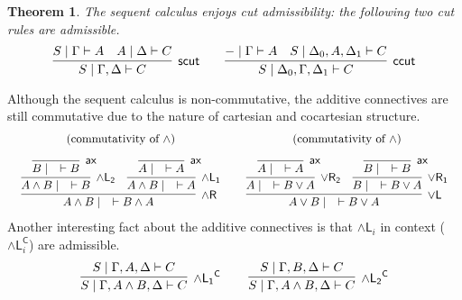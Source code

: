 \documentclass[submission,copyright,creativecommons]{eptcs}
\newtheorem{theorem}{Theorem}[section]
\theoremstyle{definition}
\newcommand{\andlone}{\land \mathsf{L_{1}}}
\newcommand{\andltwo}{\land \mathsf{L_{2}}}
\newcommand{\andli}{\land \mathsf{L}_{i}}
\newcommand{\andr}{\land \mathsf{R}}
\newcommand{\orl}{\lor \mathsf{L}}
\newcommand{\orrone}{\lor \mathsf{R_{1}}}
\newcommand{\orrtwo}{\lor \mathsf{R_{2}}}
\newcommand{\ax}{\mathsf{ax}}
\newcommand{\proofbox}[1]{\begin{tabular}{l} #1 \end{tabular}}
\begin{document}
\begin{theorem}
  The sequent calculus enjoys cut admissibility: the following two cut rules are admissible.
    \begin{displaymath}
      \infer[\mathsf{scut}]{S \mid \Gamma , \Delta \vdash C}{
        S \mid \Gamma \vdash A
        &
        A \mid \Delta \vdash C
      }
      \qquad
      \infer[\mathsf{ccut}]{S \mid \Delta_0 , \Gamma , \Delta_1 \vdash C}{
        {-} \mid \Gamma \vdash A
        &
        S \mid \Delta_0 , A , \Delta_1 \vdash C
      }
    \end{displaymath}
  \end{theorem}
  Although the sequent calculus is non-commutative, the additive connectives are still commutative due to the nature of cartesian and cocartesian structure.
  \begin{displaymath}
    \begin{array}{cc}
      (\text{commutativity of } \land) & (\text{commutativity of } \land)
      \\[10pt]
      \proofbox{
        \infer[\andr]{A \land B \mid \quad \vdash B \land A}{
          \infer[\andltwo]{A \land B \mid \quad \vdash B}{
            \infer[\ax]{B \mid \quad \vdash B}{}
          }
          &
          \infer[\andlone]{A \land B \mid \quad \vdash A}{
            \infer[\ax]{A \mid \quad \vdash A}{}
          }
        }
      }
      &
      \proofbox{
        \infer[\orl]{A \lor B \mid \quad \vdash B \lor A}{
          \infer[\orrtwo]{A \mid \quad \vdash B \lor A}{
            \infer[\ax]{A \mid \quad \vdash A}{}
          }
          &
          \infer[\orrone]{B \mid \quad \vdash B \lor A}{
            \infer[\ax]{B \mid \quad \vdash B}{}
          }
        }
      }
    \end{array}
  \end{displaymath}
  Another interesting fact about the additive connectives is that $\andli$ in context ($\andli^{\mathsf{C}}$) are admissible.
  \begin{displaymath}
    \begin{array}{c}
      \proofbox{
        \infer[\andlone^{\mathsf{C}}]{S \mid \Gamma , A \land B , \Delta \vdash C}{
          S \mid \Gamma , A ,\Delta \vdash C
        }
      }
      \quad
      \proofbox{
        \infer[\andltwo^{\mathsf{C}}]{S \mid \Gamma , A \land B , \Delta \vdash C}{
          S \mid \Gamma , B ,\Delta \vdash C
        }
      }
    \end{array}
  \end{displaymath}
\end{document}
